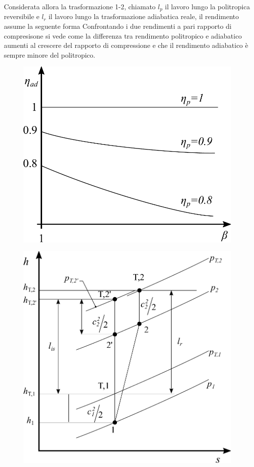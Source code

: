 Considerata allora la trasformazione 1-2, chiamato $l_p$ il lavoro lungo la politropica reversibile e $l_r$ il lavoro lungo la trasformazione adiabatica reale, il rendimento assume la seguente forma
Confrontando i due rendimenti a pari rapporto di compresisone si vede come la differenza tra rendimento politropico e adiabatico aumenti al crescere del rapporto di compressione e che il rendimento adiabatico è sempre minore del politropico.
\begin{figure}
\centering
\begin{minipage}{.45\textwidth}
  \centering
  \includegraphics[width=.9\linewidth]{fig/Rend3.pdf}
  \label{fig:Rend3}
\end{minipage}%
\begin{minipage}{.55\textwidth}
  \centering
  \includegraphics[width=.9\linewidth]{fig/Rend4.pdf}

\end{minipage}
\end{figure}
